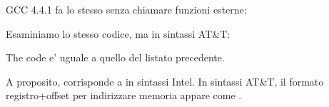 
GCC 4.4.1 fa lo stesso senza chiamare funzioni esterne:




Esaminiamo lo stesso codice, ma in sintassi AT\&T:



\myindex{\ATTSyntax}
The code e' uguale a quello del listato precedente.

A proposito,  corrisponde a  in sintassi Intel.
In sintassi AT\&T, il formato registro+offset per indirizzare memoria appare come .
